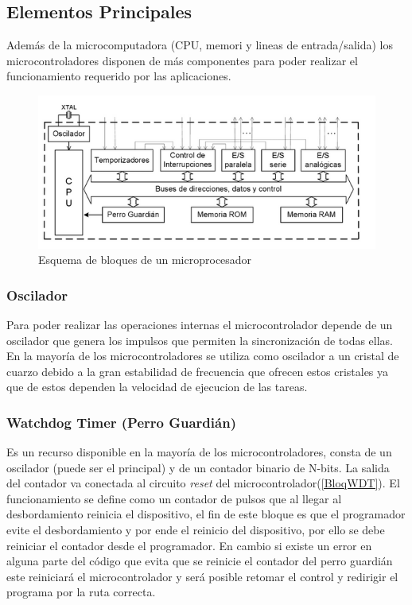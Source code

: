\documentclass[letterpaper,12pt,oneside]{book}
\begin{document}
			\subsection{Elementos Principales}
			Además de la microcomputadora (CPU, memori y lineas de entrada/salida) los microcontroladores disponen de más componentes para poder realizar el funcionamiento requerido por las aplicaciones.

			\begin{figure}[!htpb]
				\centering
				\includegraphics[scale = 1.0]{Material de Consulta/BloqMicro.PNG}
				\caption[Esquema de bloques de un microprocesador]{Esquema de bloques de un microprocesador}
				\label{BloqMicro}
			\end{figure}

				\subsubsection{Oscilador}
				Para poder realizar las operaciones internas el microcontrolador depende de un oscilador que genera los impulsos que permiten la sincronización de todas ellas. En la mayoría de los microcontroladores se utiliza como oscilador a un cristal de cuarzo debido a la gran estabilidad de frecuencia que ofrecen estos cristales ya que de estos dependen la velocidad de ejecucion de las tareas.

				\subsubsection{Watchdog Timer (Perro Guardián)}
				Es un recurso disponible en la mayoría de los microcontroladores, consta de un oscilador (puede ser el principal) y de un contador binario de N-bits. La salida del contador va conectada al circuito \textit{reset} del microcontrolador(\ref{BloqWDT}). El funcionamiento se define como un contador de pulsos que al llegar al desbordamiento reinicia el dispositivo, el fin de este bloque es que el programador evite el desbordamiento y por ende el reinicio del dispositivo, por ello se debe reiniciar el contador desde el programador. En cambio si existe un error en alguna parte del código que evita que se reinicie el contador del perro guardián este reiniciará el microcontrolador y será posible retomar el control y redirigir el programa por la ruta correcta.
\end{document}
